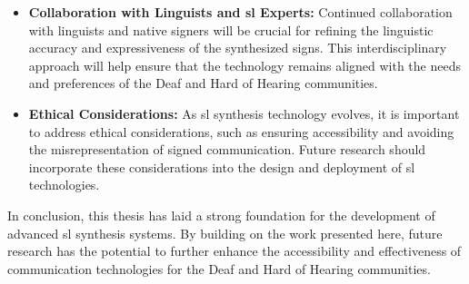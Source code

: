 \documentclass[../../main.tex]{subfiles}
\begin{document}
\begin{itemize}
    \item \textbf{Collaboration with Linguists and \gls{sl} Experts:} Continued collaboration with linguists and native signers will be crucial for refining the linguistic accuracy and expressiveness of the synthesized signs. This interdisciplinary approach will help ensure that the technology remains aligned with the needs and preferences of the Deaf and Hard of Hearing communities.
    
    \item \textbf{Ethical Considerations:} As \gls{sl} synthesis technology evolves, it is important to address ethical considerations, such as ensuring accessibility and avoiding the misrepresentation of signed communication. Future research should incorporate these considerations into the design and deployment of \gls{sl} technologies.
\end{itemize}


In conclusion, this thesis has laid a strong foundation for the development of advanced \gls{sl} synthesis systems. By building on the work presented here, future research has the potential to further enhance the accessibility and effectiveness of communication technologies for the Deaf and Hard of Hearing communities.
\end{document}
